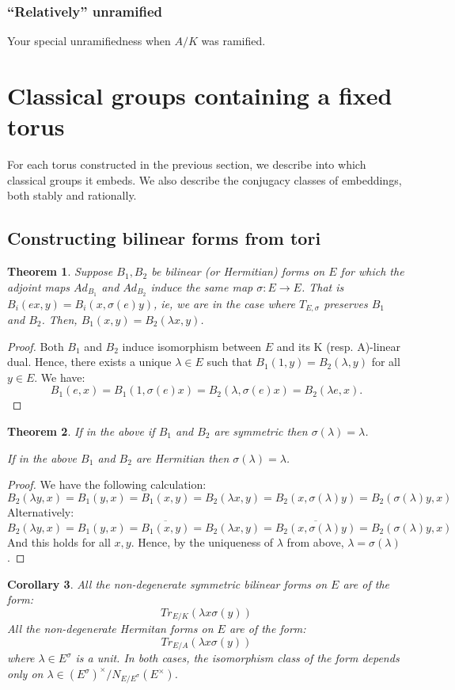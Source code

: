 \documentclass{article}
\theoremstyle{plain}
\newtheorem{theorem}{Theorem}[section]
\newtheorem{corollary}[theorem]{Corollary}
\theoremstyle{definition}
\numberwithin{equation}{section}
\begin{document}
\subsubsection{``Relatively'' unramified}

Your special unramifiedness when $A/K$ was ramified.

\section{Classical groups containing a fixed torus}

For each torus constructed in the previous section, we describe into which classical groups it embeds.  We also describe the conjugacy classes of embeddings, both stably and rationally.

\subsection{Constructing bilinear forms from tori}

\begin{theorem}
Suppose $B_1,B_2$ be bilinear (or Hermitian) forms on $E$ for which the adjoint maps $Ad_{B_1}$ and $Ad_{B_2}$ induce the same map $\sigma:E\rightarrow E$.
That is $B_i(ex,y) = B_i(x,\sigma(e)y)$, ie, we are in the case where $T_{E,\sigma}$ preserves $B_1$ and $B_2$.
Then, $B_1(x,y) = B_2(\lambda x,y)$.
\end{theorem}
\begin{proof}
Both $B_1$ and $B_2$ induce isomorphism between $E$ and its K (resp. A)-linear dual.
Hence, there exists a unique $\lambda\in E$ such that $B_1(1,y) = B_2(\lambda,y)$ for all $y\in E$.
We have:
\[ B_1(e,x) = B_1(1,\sigma(e)x) = B_2(\lambda,\sigma(e)x) = B_2(\lambda e,x). \]
\end{proof}
\begin{theorem}
If in the above if $B_1$ and $B_2$ are symmetric then $\sigma(\lambda)=\lambda$.

If in the above $B_1$ and $B_2$ are Hermitian then $\sigma(\lambda)=\lambda$.
\end{theorem}
\begin{proof}
We have the following calculation:
\[ B_2(\lambda y,x) = B_1(y,x) = B_1(x,y) = B_2(\lambda x,y) = B_2(x,\sigma(\lambda) y) = B_2(\sigma(\lambda)y,x) \]
Alternatively:
\[ B_2(\lambda y,x) = B_1(y,x) = \overline{B_1(x,y)} = B_2(\lambda x,y) = \overline{B_2(x,\sigma(\lambda) y)} = B_2(\sigma(\lambda)y,x) \]
And this holds for all $x,y$.
Hence, by the uniqueness of $\lambda$ from above, $\lambda=\sigma(\lambda)$.
\end{proof}
\begin{corollary}
All the non-degenerate symmetric bilinear forms on $E$ are of the form:
\[ Tr_{E/K}(\lambda x\sigma(y)) \]
All the non-degenerate Hermitan forms on $E$ are of the form:
\[ Tr_{E/A}(\lambda x\sigma(y)) \]
where $\lambda \in E^\sigma$ is a unit.
In both cases, the isomorphism class of the form depends only on $\lambda \in (E^\sigma)^\times/N_{E/E^\sigma}(E^\times)$.
\end{corollary}
\end{document}
